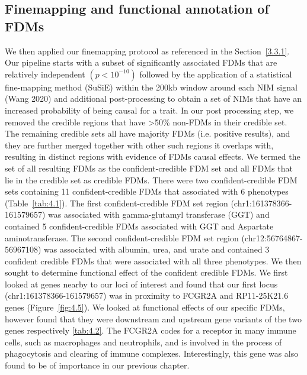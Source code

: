 \subsection{Finemapping and functional annotation of FDMs}
We then applied our finemapping protocol as referenced in the Section~\ref{3.3.1}. Our pipeline starts with a subset of significantly associated FDMs that are relatively independent $(p < 10^{-10})$ followed by the application of a statistical fine-mapping method (SuSiE) within the 200kb window around each NIM signal (Wang 2020) and additional post-processing to obtain a set of NIMs that have an increased probability of being causal for a trait. In our post processing step, we removed the credible regions that have >50\% non-FDMs in their credible set. The remaining credible sets all have majority FDMs (i.e. positive results), and they are further merged together with other such regions it overlaps with, resulting in distinct regions with evidence of FDMs causal effects. We termed the set of all resulting FDMs as the confident-credible FDM set and all FDMs that lie in the credible set as credible FDMs. There were two confident-credible FDM sets containing 11 confident-credible FDMs that associated with 6 phenotypes (Table~\ref{tab:4.1}). The first confident-credible FDM set region (chr1:161378366-161579657) was associated with gamma-glutamyl transferase (GGT) and contained 5 confident-credible FDMs associated with GGT and Aspartate aminotransferase. The second confident-credible FDM set region (chr12:56764867-56967108) was associated with albumin, urea, and urate and contained 3 confident credible FDMs that were associated with all three phenotypes. 
We then sought to determine functional effect of the confident credible FDMs. We  first looked at genes nearby to our loci of interest and found that our first locus (chr1:161378366-161579657) was in proximity to FCGR2A and RP11-25K21.6 genes (Figure~\ref{fig:4.5}). We looked at functional effects of our specific FDMs, however found that they were downstream and upstream gene variants of the two genes respectively \ref{tab:4.2}. The FCGR2A codes for a receptor in many immune cells, such as macrophages and neutrophils, and is involved in the process of phagocytosis and clearing of immune complexes. Interestingly, this gene was also found to be of importance in our previous chapter. 
